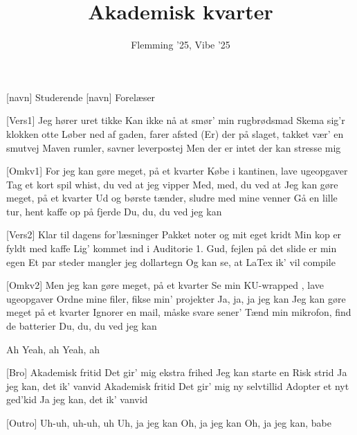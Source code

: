 \documentclass[a4paper,11pt]{article}
\title{Akademisk kvarter}
\author{Flemming '25, Vibe '25 }
\begin{document}
\maketitle

\begin{roles}
[navn] Studerende
[navn] Forelæser
\end{roles}

\begin{song}
  [Vers1] Jeg hører uret tikke
  Kan ikke nå at smør’ min rugbrødsmad
  Skema sig’r klokken otte
  Løber ned af gaden, farer afsted
  (Er) der på slaget, takket vær’ en smutvej
  Maven rumler, savner leverpostej
  Men der er intet der kan stresse mig


  [Omkv1] For jeg kan gøre meget, på et kvarter
  Købe i kantinen, lave ugeopgaver
  Tag et kort spil whist, du ved at jeg vipper
  Med, med, du ved at
  Jeg kan gøre meget, på et kvarter
  Ud og børste tænder, sludre med mine venner
  Gå en lille tur, hent kaffe op på fjerde
  Du, du, du ved jeg kan

  [Vers2] Klar til dagens for’læsninger
  Pakket noter og mit eget kridt
  Min kop er fyldt med kaffe
  Lig’ kommet ind i Auditorie 1.
  Gud, fejlen på det slide er min egen 
  Et par steder mangler jeg dollartegn
  Og kan se, at LaTex ik’ vil compile

  [Omkv2] Men jeg kan gøre meget, på et kvarter
  Se min KU-wrapped , lave ugeopgaver
  Ordne mine filer, fikse min’ projekter
  Ja, ja, ja jeg kan
  Jeg kan gøre meget på et kvarter
  Ignorer en mail, måske svare sener'
  Tænd min mikrofon, find de batterier
  Du, du, du ved jeg kan

   Ah
  Yeah, ah
  Yeah, ah

  [Bro] Akademisk fritid
  Det gir’ mig ekstra frihed
  Jeg kan starte en Risk strid
  Ja jeg kan, det ik’ vanvid
  Akademisk fritid
  Det gir’ mig ny selvtillid
  Adopter et nyt ged’kid
  Ja jeg kan, det ik’ vanvid

  [Outro] Uh-uh, uh-uh, uh
  Uh, ja jeg kan
  Oh, ja jeg kan
  Oh, ja jeg kan, babe


\end{song}
\end{document}
